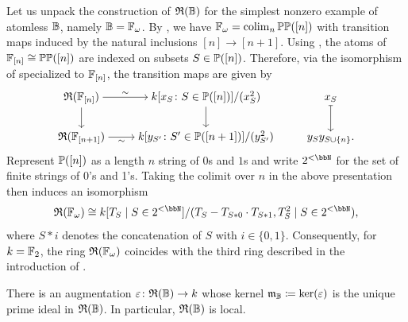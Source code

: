 \documentclass{amsart}
\begin{document}
    \begin{Exa}\label{exa:HSring}
        Let us unpack the construction of $\mathfrak{R}(\mathbb{B})$ for the simplest nonzero example of atomless $\mathbb{B}$, namely $\mathbb{B} = \mathbb{F}_{\omega}$. By , we have  $\mathbb{F}_{\omega} = \operatorname{colim}_n\mathbb{P}\mathbb{P}([n])$ with transition maps induced by the natural inclusions $[n] \to [n+1]$. Using , the atoms of $\mathbb{F}_{[n]} \cong \mathbb{P}\mathbb{P}([n])$ are indexed on subsets $S \in \mathbb{P}([n])$. Therefore, via the isomorphism of  specialized to $\mathbb{F}_{[n]}$, the transition maps are given by
    \[\begin{tikzcd}[cramped]
    	{\R{\ba{F}_{[n]}}} & {k[x_S\colon S \in \ba{P}([n])]/(x_S^2)} & {x_S} \\
    	{\R{\ba{F}_{[n+1]}}} & {k[y_{S'}\colon {S'} \in \ba{P}([n+1])]/(y_{S'}^2)} & {y_Sy_{S \cup \{n\}}.}
    	\arrow["\sim", from=1-1, to=1-2]
    	\arrow[from=1-1, to=2-1]
    	\arrow[from=1-2, to=2-2]
    	\arrow[maps to, from=1-3, to=2-3]
    	\arrow["\sim"', from=2-1, to=2-2]
    \end{tikzcd}\]
        Represent $\mathbb{P}([n])$ as a length $n$ string of $0$s and $1$s and write $2^{<\bbN}$ for the set of finite strings of 0's and 1's. Taking the colimit over $n$ in the above presentation then induces an isomorphism
            \[  
                \R{\ba{F}_{\omega}} \cong k[T_S \mid S \in 2^{<\bbN}]/(T_S-T_{S \ast 0} \cdot T_{S \ast 1},T_S^2 \mid S \in 2^{<\bbN}),
            \]
        where $S\ast i$ denotes the concatenation of $S$ with $i\in\{0,1\}$. Consequently, for $k = \mathbb{F}_2$, the ring $\mathfrak{R}(\mathbb{F}_{\omega})$ coincides with the third ring described in the introduction of \cite{hebestreit2024note}.
    \end{Exa}
    \begin{Lem}\label{lem:localring}
        There is an augmentation $\varepsilon\colon \mathfrak{R}(\mathbb{B}) \to k$ whose kernel $\mathfrak{m}_{\mathbb{B}}\coloneqq \ker(\varepsilon)$ is the unique prime ideal in $\mathfrak{R}(\mathbb{B})$. In particular, $\mathfrak{R}(\mathbb{B})$ is local.
    \end{Lem}
\end{document}
